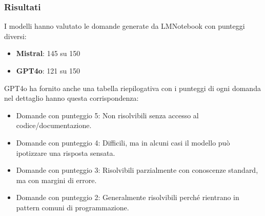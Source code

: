 \documentclass[12pt,a4paper,openright,twoside]{book}
\begin{document}
\subsubsection{Risultati}
I modelli hanno valutato le domande generate da LMNotebook con punteggi diversi:
\begin{itemize}
    \item \textbf{Mistral}: 145 su 150
    \item \textbf{GPT4o}: 121 su 150
\end{itemize}
GPT4o ha fornito anche una tabella riepilogativa con i punteggi di ogni domanda nel dettaglio hanno questa corrispondenza:
\begin{itemize}
    \item Domande con punteggio 5: Non risolvibili senza accesso al codice/documentazione.
    \item Domande con punteggio 4: Difficili, ma in alcuni casi il modello può ipotizzare una risposta sensata.
    \item Domande con punteggio 3: Risolvibili parzialmente con conoscenze standard, ma con margini di errore.
    \item Domande con punteggio 2: Generalmente risolvibili perché rientrano in pattern comuni di programmazione.
\end{itemize}
\end{document}
